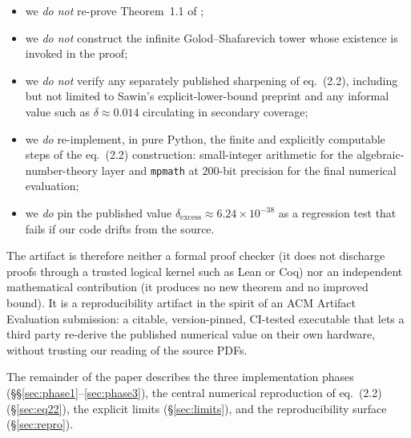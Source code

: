 \begin{itemize}[leftmargin=*]
  \item we \emph{do not} re-prove Theorem~1.1 of
        \cite{Sawin2026Remarks};
  \item we \emph{do not} construct the infinite Golod--Shafarevich tower
        whose existence is invoked in the proof;
  \item we \emph{do not} verify any separately published sharpening of
        eq.~(2.2), including but not limited to Sawin's
        explicit-lower-bound preprint and any informal value such as
        $\delta \approx 0.014$ circulating in secondary coverage;
  \item we \emph{do} re-implement, in pure Python, the finite and
        explicitly computable steps of the eq.~(2.2) construction:
        small-integer arithmetic for the algebraic-number-theory layer
        and \texttt{mpmath} at $200$-bit precision for the final
        numerical evaluation;
  \item we \emph{do} pin the published value
        $\delta_{\text{excess}} \approx 6.24 \times 10^{-38}$ as a
        regression test that fails if our code drifts from the source.
\end{itemize}

The artifact is therefore neither a formal proof checker (it does not
discharge proofs through a trusted logical kernel such as Lean or Coq)
nor an independent mathematical contribution (it produces no new
theorem and no improved bound). It is a reproducibility artifact in
the spirit of an ACM Artifact Evaluation submission: a citable,
version-pinned, CI-tested executable that lets a third party re-derive
the published numerical value on their own hardware, without trusting
our reading of the source PDFs.

The remainder of the paper describes the three implementation phases
(\S\S\ref{sec:phase1}--\ref{sec:phase3}), the central numerical
reproduction of eq.~(2.2) (\S\ref{sec:eq22}), the explicit limits
(\S\ref{sec:limits}), and the reproducibility surface
(\S\ref{sec:repro}).

